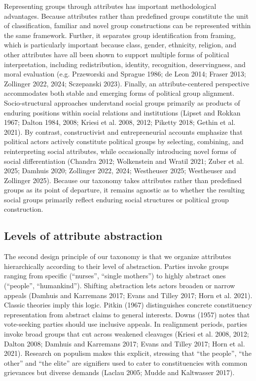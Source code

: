 \documentclass[12pt]{article}
\begin{document}
Representing groups through attributes has important methodological advantages.
Because attributes rather than predefined groups constitute the unit of classification, familiar and novel group constructions can be represented within the same framework.
Further, it separates group identification from framing, which is particularly important because class, gender, ethnicity, religion, and other attributes have all been shown to support multiple forms of political interpretation, including redistribution, identity, recognition, deservingness, and moral evaluation (e.g. Przeworski and Sprague 1986; de Leon 2014; Fraser 2013; Zollinger 2022, 2024; Sczepanski 2023).
Finally, an attribute-centered perspective accommodates both stable and emerging forms of political group alignment.
Socio-structural approaches understand social groups primarily as products of enduring positions within social relations and institutions (Lipset and Rokkan 1967; Dalton 1984, 2008; Kriesi et al. 2008, 2012; Piketty 2018; Gethin et al. 2021).
By contrast, constructivist and entrepreneurial accounts emphasize that political actors actively constitute political groups by selecting, combining, and reinterpreting social attributes, while occasionally introducing novel forms of social differentiation (Chandra 2012; Wolkenstein and Wratil 2021; Zuber et al. 2025; Damhuis 2020; Zollinger 2022, 2024; Westheuser 2025; Westheuser and Zollinger 2025).
Because our taxonomy takes attributes rather than predefined groups as its point of departure, it remains agnostic as to whether the resulting social groups primarily reflect enduring social structures or political group construction.

\subsection{Levels of attribute abstraction}\label{levels-of-attribute-abstraction}

The second design principle of our taxonomy is that we organize attributes hierarchically according to their level of abstraction.
Parties invoke groups ranging from specific (``nurses'', ``single mothers'') to highly abstract ones (``people'', ``humankind'').
Shifting abstraction lets actors broaden or narrow appeals (Damhuis and Karremans 2017; Evans and Tilley 2017; Horn et al. 2021).
Classic theories imply this logic.
Pitkin (1967) distinguishes concrete constituency representation from abstract claims to general interests.
Downs (1957) notes that vote-seeking parties should use inclusive appeals.
In realignment periods, parties invoke broad groups that cut across weakened cleavages (Kriesi et al. 2008, 2012; Dalton 2008; Damhuis and Karremans 2017; Evans and Tilley 2017; Horn et al. 2021).
Research on populism makes this explicit, stressing that ``the people'', ``the other'' and ``the elite'' are signifiers used to cater to constituencies with common grievances but diverse demands (Laclau 2005; Mudde and Kaltwasser 2017).
\end{document}
